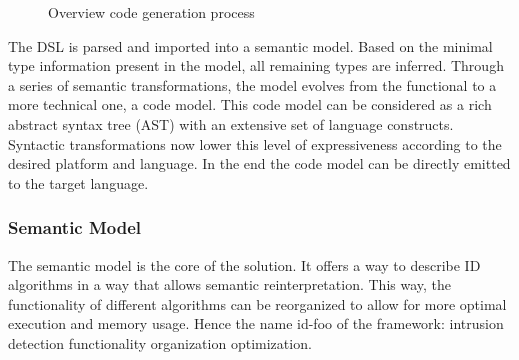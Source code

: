 \documentclass[conference]{IEEEtran}
\newcommand{\NAME}{id-foo\xspace}
\begin{document}
\begin{figure}[ht]
  \centering
\caption{Overview code generation process}
\label{fig:code-generation}
\end{figure}

The DSL is parsed and imported into a semantic model. Based on the minimal type
information present in the model, all remaining types are inferred. Through a
series of semantic transformations, the model evolves from the functional to a
more technical one, a code model. This code model can be considered as a rich
abstract syntax tree (AST) with an extensive set of language constructs.
Syntactic transformations now lower this level of expressiveness according to
the desired platform and language. In the end the code model can be directly
emitted to the target language.

\subsubsection*{Semantic Model}

The semantic model is the core of the solution. It offers a way to describe ID
algorithms in a way that allows semantic reinterpretation. This way, the
functionality of different algorithms can be reorganized to allow for more
optimal execution and memory usage. Hence the name \NAME of the framework:
intrusion detection functionality organization optimization.
\end{document}
